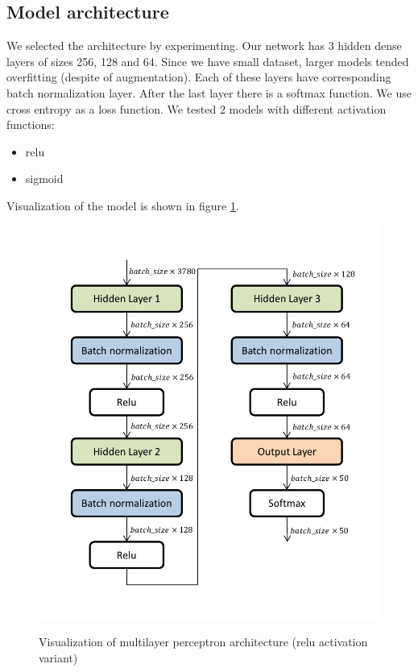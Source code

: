 \documentclass[a4paper]{article}
\begin{document}
\subsection{Model architecture}
We selected the architecture by experimenting.
Our network has 3 hidden dense layers of sizes 256, 128 and 64.
Since we have small dataset, larger models tended overfitting
(despite of augmentation).
Each of these layers have corresponding batch normalization layer.
After the last layer there is a softmax function.
We use cross entropy as a loss function.
We tested 2 models with different activation functions:
\begin{itemize}
    \item relu
    \item sigmoid
\end{itemize}

\clearpage
Visualization of the model is shown in figure \ref{fig:arch}.

\begin{figure}[H]
    \caption[]{Visualization of multilayer perceptron architecture (relu activation variant)}
    \centering
    \includegraphics[page=1,width=1.0\textwidth]{architecture.pdf}
    \label{fig:arch}
\end{figure}
\end{document}
